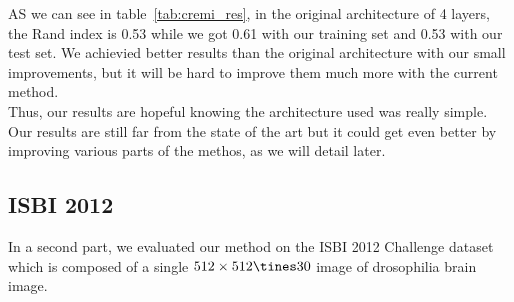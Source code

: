AS we can see in table~\ref{tab:cremi_res}, in the original architecture of 4 layers, 
the Rand index is 0.53 while we got 0.61 with our training set and 0.53 with our test set.
We achievied better results than the original architecture with our small
improvements, but it will be hard to improve them much more with the current
method.\\

Thus, our results are hopeful knowing the architecture used was really simple.\\ 
Our results are still far from the state of the art but it could get even
better by improving various parts of the methos, as we will detail later.\\

\subsection{ISBI 2012}

In a second part, we evaluated our method on the ISBI 2012 Challenge dataset
which is composed of a single $512\times512\tines30$ image of drosophilia brain
image.\\

